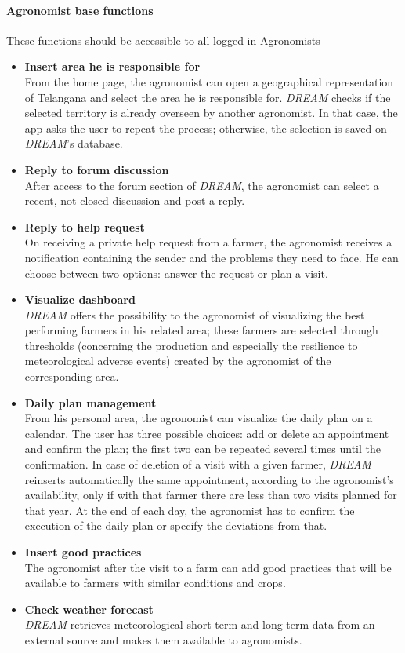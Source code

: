 \paragraph{Agronomist base functions}
These functions should be accessible to all logged-in Agronomists
\begin{itemize}
    \item\textbf{Insert area he is responsible for}\\
    From the home page, the agronomist can open a geographical representation of Telangana
    and select the area he is responsible for. \emph{DREAM} checks if the selected territory is already overseen
    by another agronomist. In that case, the app asks the user to repeat the process;
    otherwise, the selection is saved on \emph{DREAM}'s database.
    \item \textbf{Reply to forum discussion}\\
    After access to the forum section of \emph{DREAM}, the agronomist can select a recent,
    not closed discussion and post a reply.
    \item \textbf{Reply to help request}\\
    On receiving a private help request from a farmer, the agronomist receives a notification containing the sender
    and the problems they need to face. He can choose between two options: answer the request or plan a visit.
    \item \textbf{Visualize dashboard}\\
    \emph{DREAM} offers the possibility to the agronomist of visualizing the best
    performing farmers in his related area; these farmers are selected through thresholds
    (concerning the production and especially the resilience to meteorological adverse events)
    created by the agronomist of the corresponding area.
    \item\textbf{Daily plan management}\\
    From his personal area, the agronomist can visualize the daily plan on a calendar.
    The user has three possible choices: add or delete an appointment and confirm the plan;
    the first two can be repeated several times until the confirmation. In case of deletion of a visit with a given farmer,
    \emph{DREAM} reinserts automatically the same appointment, according to the agronomist's availability,
    only if with that farmer there are less than two visits planned for that year.
    \newline At the end of each day, the agronomist has to confirm the execution of the daily plan or specify
    the deviations from that.
    \item\textbf{Insert good practices}\\
    The agronomist after the visit to a farm can add good practices
    that will be available to farmers with similar conditions and crops.
    \item \textbf{Check weather forecast}\\
    \emph{DREAM} retrieves meteorological short-term and long-term data from an external source and makes them available
    to agronomists.
\end{itemize}


